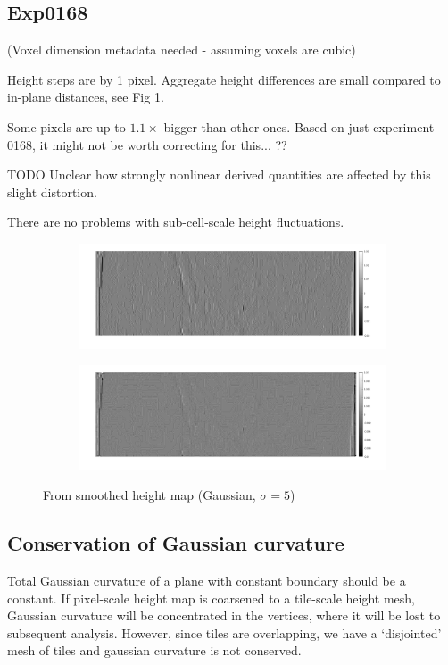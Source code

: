 \documentclass[10pt,a4paper]{article}
\begin{document}
\subsection{Exp0168}
(Voxel dimension metadata needed - assuming voxels are cubic)

Height steps are by 1 pixel.  Aggregate height differences are small compared to in-plane distances, see Fig 1.

Some pixels are up to $1.1 \times$ bigger than other ones.  Based on just experiment 0168, it might not be worth correcting for this... ??  

TODO Unclear how strongly nonlinear derived quantities are affected by this slight distortion.

There are no problems with sub-cell-scale height fluctuations.

\begin{figure}
\begin{subfigure}{\textwidth}
\centering
\includegraphics[width=\textwidth]{435_smooth5_gC.png}
\end{subfigure}
\begin{subfigure}{\textwidth}
\includegraphics[width=\textwidth]{435_smooth5_mc.png}
\end{subfigure}
\caption{From smoothed height map (Gaussian, $\sigma=5$)}
\end{figure}

\subsection{Conservation of Gaussian curvature}
Total Gaussian curvature of a plane with constant boundary should be a constant.  If pixel-scale height map is coarsened to a tile-scale height mesh, Gaussian curvature will be concentrated in the vertices, where it will be lost to subsequent analysis.  However, since tiles are overlapping, we have a `disjointed' mesh of tiles and gaussian curvature is not conserved.
\end{document}
